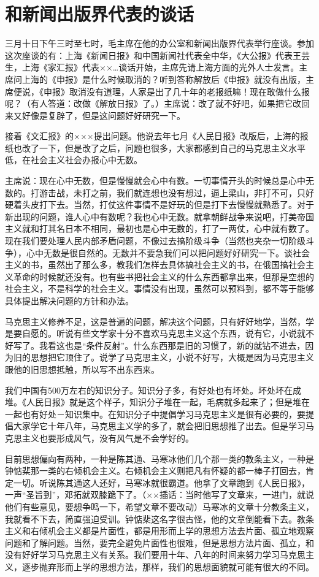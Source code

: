 \section[和新闻出版界代表的谈话（一九五七年三月十日）]{和新闻出版界代表的谈话}


三月十日下午三时至七时，毛主席在他的办公室和新闻出版界代表举行座谈。参加这次座谈的有：上海《新闻日报》和中国新闻社代表全中华，《大公报》代表王芸生，上海《家汇报》代表××…谈话开始，主席先请上海方面的光外人士发言。主席问上海的《申报》是什么时候取消的？听到答称解放后《申报》就没有出版，主席便说，《申报》取消没有道理，人家是出了几十年的老报纸嘛！现在敢做什么报呢？（有人答道：改做《解放日报》了。）主席说：改了就不好吧，如果把它改回来又好像是复辟了，但是这问题好好研究一下。

接着《文汇报》的×××提出问题。他说去年七月《人民日报》改版后，上海的报纸也改了一下，但是改了之后，问题也很多，大家都感到自己的马克思主义水平低，在社会主义社会办报心中无数。

主席说：现在心中无数，但是慢慢就会心中有数。一切事情开头的时候总是心中无数的。打游击战，未打之前，我们就连想也没有想过，逼上梁山，非打不可，只好硬着头皮打下去。当然，打仗这件事情不是好玩的但是打下去慢慢就熟悉了。对于新出现的问题，谁人心中有数呢？我也心中无数。就拿朝鲜战争来说吧，打美帝国主义就和打其名日本不相同，最初也是心中无数的，打了一两仗，心中就有数了。现在我们要处理人民内部矛盾问题，不像过去搞阶级斗争（当然也夹杂一切阶级斗争），心中无数是很自然的。无数并不要急我们可以把问题好好研究一下。谈社会主义的书，虽然出了那么多，教我们怎样去具体搞社会主义的书，在俄国搞社会主义革命的时候就还没有。也有些书把社会主义的什么东西都拿出来，但那是空想的社会主义，不是科学的社会主义。事情没有出现，虽然可以预料到，都不等于能够具体提出解决问题的方针和办法。

马克思主义修养不足，这是普遍的问题，解决这个问题，只有好好地学，当然，学是要自愿的。听说有些文学家十分不喜欢马克思主义这个东西，说有它，小说就不好写了。我看这也是“条件反射”。什么东西那是旧的习惯了，新的就钻不进去，因为旧的思想把它顶住了。说学了马克思主义，小说不好写，大概是因为马克思主义跟他的旧思想抵触，所以写不出东西来。

我们中国有500万左右的知识分子。知识分子多，有好处也有坏处。坏处坏在成堆。《人民日报》就是这个样子，知识分子堆在一起，毛病就多起来了；但是堆在一起也有好处－知识集中。在知识分子中提倡学习马克思主义是很有必要的，要提倡大家学它十年八年，马克思主义学的多了，就会把旧思想推了出去。但是学习马克思主义也要形成风气，没有风气是不会学好的。

目前思想偏向有两种，一种是陈其通、马寒冰他们几个那一类的教条主义，一种是钟惦棐那一类的右倾机会主义。右倾机会主义则把凡有怀疑的都一棒子打回去，肯定一切。听说陈其通这人还好，马寒冰就很霸道。他拿了文章跑到《人民日报》，一声“圣旨到”，邓拓就双膝跪下了。（××插话：当时他写了文章来，一进门，就说他们有些意见，要想争鸣一下，希望文章不要改动）马寒冰的文章十分教条主义，我就看不下去，简直强迫受训。钟惦棐这名字很古怪，他的文章倒能看下去。教条主义和右倾机会主义都是片面性，都是用形而上学的思想方法去片面、孤立地观察问题和了解问题。当然，要完全避免片面性也很难，但是思想方法片面、孤立，和没有好好学习马克思主义有关系。我们要用十年、八年的时间来努力学习马克思主义，逐步抛弃形而上学的思想方法，那样，我们的思想面貌就可能有很大的不同。

